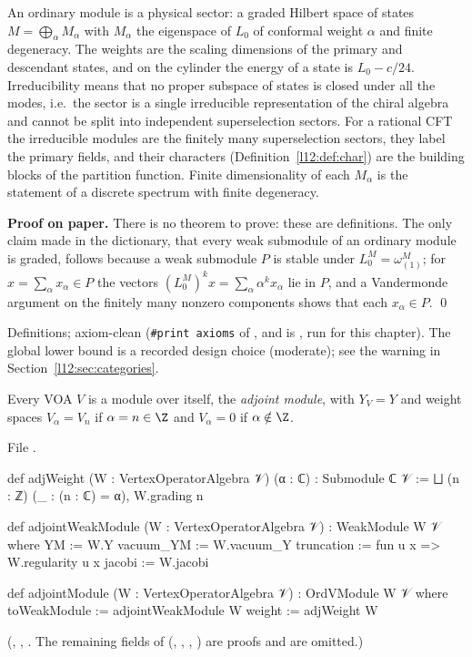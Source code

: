 \begin{physics}
An ordinary module is a physical sector: a graded Hilbert space of states $M=\bigoplus_\alpha M_\alpha$ with $M_\alpha$ the
eigenspace of $L_0$ of conformal weight $\alpha$ and finite degeneracy. The weights are the scaling dimensions of the
primary and descendant states, and on the cylinder the energy of a state is $L_0-c/24$. Irreducibility means that no proper
subspace of states is closed under all the modes, i.e.\ the sector is a single irreducible representation of the chiral
algebra and cannot be split into independent superselection sectors. For a rational CFT the irreducible modules are the finitely many
superselection sectors, they label the primary fields, and their characters (Definition~\ref{l12:def:char}) are the building blocks of the partition
function. Finite dimensionality of each $M_\alpha$ is the statement of a discrete spectrum with finite degeneracy.
\end{physics}

\textbf{Proof on paper.} There is no theorem to prove: these are definitions. The only claim made in the dictionary, that every weak
submodule of an ordinary module is graded, follows because a weak submodule $P$ is stable under $L_0^M=\omega^M_{(1)}$; for
$x=\sum_\alpha x_\alpha\in P$ the vectors $(L_0^M)^kx = \sum_\alpha\alpha^kx_\alpha$ lie in $P$, and a Vandermonde argument on the
finitely many nonzero components shows that each $x_\alpha\in P$. \qed

\begin{status}
Definitions; axiom-clean (\texttt{\#print axioms} of ,  and
 is \lean{[propext, Classical.}\allowbreak{}\allowbreak\lean{sound]}, run for this chapter).
The global lower bound is a recorded design choice (moderate); see the warning in Section~\ref{l12:sec:categories}.
\end{status}

\begin{definition}\label{l12:def:adjoint}
Every VOA $V$ is a module over itself, the \emph{adjoint module}, with $Y_V = Y$ and weight spaces $V_\alpha = V_n$ if $\alpha = n\in\Z$ and
$V_\alpha = 0$ if $\alpha\notin\Z$.
\end{definition}
\noindent File .
\begin{leancode}
def adjWeight (W : VertexOperatorAlgebra 𝒱) (α : ℂ) : Submodule ℂ 𝒱 :=
  ⨆ (n : ℤ) (_ : (n : ℂ) = α), W.grading n

def adjointWeakModule (W : VertexOperatorAlgebra 𝒱) : WeakModule W 𝒱 where
  YM := W.Y
  vacuum_YM := W.vacuum_Y
  truncation := fun u x => W.regularity u x
  jacobi := W.jacobi

def adjointModule (W : VertexOperatorAlgebra 𝒱) : OrdVModule W 𝒱 where
  toWeakModule := adjointWeakModule W
  weight := adjWeight W
\end{leancode}
(, , . The remaining fields of 
(, , , ) are proofs and are omitted.)

